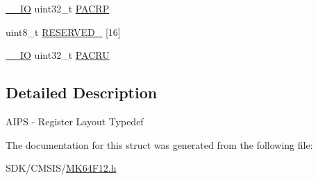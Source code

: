 \begin{DoxyCompactItemize}
\mbox{\hyperlink{core__cm4_8h_aec43007d9998a0a0e01faede4133d6be}{\+\_\+\+\_\+\+IO}} uint32\+\_\+t \mbox{\hyperlink{group___v_r_e_f___peripheral___access___layer_ga3b51b9ee44617dedea460d1a531db9fe}{P\+A\+C\+RP}}
\item 
uint8\+\_\+t \mbox{\hyperlink{group___v_r_e_f___peripheral___access___layer_ga290262cc4edb96ebeefaae3da3cda0d7}{R\+E\+S\+E\+R\+V\+E\+D\+\_}} \mbox{[}16\mbox{]}
\item 
\mbox{\hyperlink{core__cm4_8h_aec43007d9998a0a0e01faede4133d6be}{\+\_\+\+\_\+\+IO}} uint32\+\_\+t \mbox{\hyperlink{group___v_r_e_f___peripheral___access___layer_ga8f7f8d13e89ff056716554def249398b}{P\+A\+C\+RU}}
\end{DoxyCompactItemize}


\subsection{Detailed Description}
A\+I\+PS -\/ Register Layout Typedef 

The documentation for this struct was generated from the following file\+:\begin{DoxyCompactItemize}
\item 
S\+D\+K/\+C\+M\+S\+I\+S/\mbox{\hyperlink{_m_k64_f12_8h}{M\+K64\+F12.\+h}}\end{DoxyCompactItemize}
